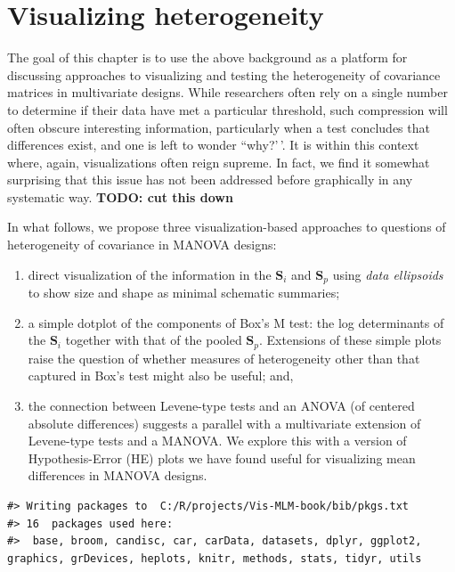 \documentclass[
  letterpaper,
  10pt,
  krantz2]{krantz}
\begin{document}
\hypertarget{visualizing-heterogeneity}{%
\section{Visualizing heterogeneity}\label{visualizing-heterogeneity}}

The goal of this chapter is to use the above background as a platform
for discussing approaches to visualizing and testing the heterogeneity
of covariance matrices in multivariate designs. While researchers often
rely on a single number to determine if their data have met a particular
threshold, such compression will often obscure interesting information,
particularly when a test concludes that differences exist, and one is
left to wonder ``why?'\,'. It is within this context where, again,
visualizations often reign supreme. In fact, we find it somewhat
surprising that this issue has not been addressed before graphically in
any systematic way. \textbf{TODO: cut this down}

In what follows, we propose three visualization-based approaches to
questions of heterogeneity of covariance in MANOVA designs:

\begin{enumerate}
\def\labelenumi{(\alph{enumi})}
\item
  direct visualization of the information in the \(\mathbf{S}_i\) and
  \(\mathbf{S}_p\) using \emph{data ellipsoids} to show size and shape
  as minimal schematic summaries;
\item
  a simple dotplot of the components of Box's M test: the log
  determinants of the \(\mathbf{S}_i\) together with that of the pooled
  \(\mathbf{S}_p\). Extensions of these simple plots raise the question
  of whether measures of heterogeneity other than that captured in Box's
  test might also be useful; and,
\item
  the connection between Levene-type tests and an ANOVA (of centered
  absolute differences) suggests a parallel with a multivariate
  extension of Levene-type tests and a MANOVA. We explore this with a
  version of Hypothesis-Error (HE) plots we have found useful for
  visualizing mean differences in MANOVA designs.
\end{enumerate}

\begin{verbatim}
#> Writing packages to  C:/R/projects/Vis-MLM-book/bib/pkgs.txt
#> 16  packages used here:
#>  base, broom, candisc, car, carData, datasets, dplyr, ggplot2, graphics, grDevices, heplots, knitr, methods, stats, tidyr, utils
\end{verbatim}
\end{document}
